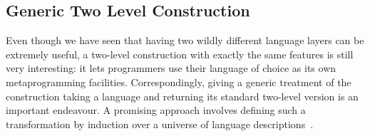 \subsection{Generic Two Level Construction}
Even though we have seen that having two wildly different
language layers can be extremely useful, a two-level
construction with exactly the same features is still very
interesting: it lets programmers use their language of choice
as its own metaprogramming facilities.
%
Correspondingly, giving a generic treatment of the construction
taking a language and returning its standard two-level version
is an important endeavour.
%
A promising approach involves defining such a transformation
by induction over a universe of language
descriptions~\cite{DBLP:journals/jfp/AllaisACMM21}.

